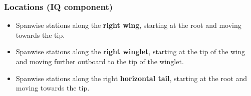 \subsubsection{Locations (IQ component)}
\begin{itemize}
  \item Spanwise stations along the \textbf{right wing}, starting at the root and moving towards the tip.
  \item Spanwise stations along the \textbf{right winglet}, starting at the tip of the wing and moving further outboard to the tip of the winglet.
  \item Spanwise stations along the right \textbf{horizontal tail}, starting at the root and moving towards the tip.
\end{itemize}

%
%
%
%
%
%
%
%


